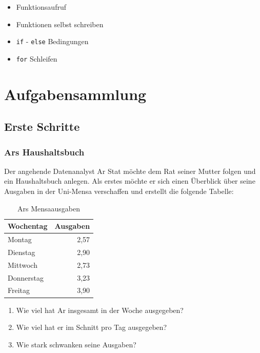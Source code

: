 \documentclass[]{book}
\providecommand{\tightlist}{%
  \setlength{\itemsep}{0pt}\setlength{\parskip}{0pt}}
\begin{document}
\begin{itemize}
\tightlist
\item
  Funktionsaufruf
\item
  Funktionen selbst schreiben
\item
  \texttt{if} - \texttt{else} Bedingungen
\item
  \texttt{for} Schleifen
\end{itemize}

\hypertarget{aufgabensammlung}{%
\chapter{Aufgabensammlung}\label{aufgabensammlung}}

\hypertarget{erste-schritte}{%
\section{Erste Schritte}\label{erste-schritte}}

\hypertarget{ars-haushaltsbuch}{%
\subsection{Ars Haushaltsbuch}\label{ars-haushaltsbuch}}

Der angehende Datenanalyst Ar Stat möchte dem Rat seiner Mutter folgen und ein Haushaltsbuch anlegen. Als erstes möchte er sich einen Überblick über seine Ausgaben in der Uni-Mensa verschaffen und erstellt die folgende Tabelle:

\begin{table}

\caption{\label{tab:unnamed-chunk-43}Ars Mensaausgaben}
\centering
\begin{tabular}[t]{lr}
\toprule
Wochentag & Ausgaben\\
\midrule
Montag & 2,57\\
Dienstag & 2,90\\
Mittwoch & 2,73\\
Donnerstag & 3,23\\
Freitag & 3,90\\
\bottomrule
\end{tabular}
\end{table}

\begin{enumerate}
\def\labelenumi{\arabic{enumi}.}
\tightlist
\item
  Wie viel hat Ar insgesamt in der Woche ausgegeben?
\item
  Wie viel hat er im Schnitt pro Tag ausgegeben?
\item
  Wie stark schwanken seine Ausgaben?
\end{enumerate}
\end{document}
